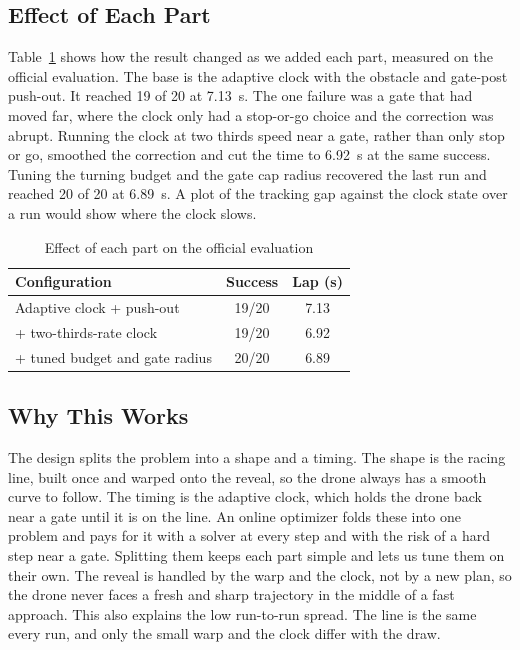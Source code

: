 \documentclass[conference]{IEEEtran}
\begin{document}
\subsection{Effect of Each Part}
Table~\ref{tab:ablation} shows how the result changed as we added each part, measured on the official evaluation. The base is the adaptive clock with the obstacle and gate-post push-out. It reached 19 of 20 at 7.13~s. The one failure was a gate that had moved far, where the clock only had a stop-or-go choice and the correction was abrupt. Running the clock at two thirds speed near a gate, rather than only stop or go, smoothed the correction and cut the time to 6.92~s at the same success. Tuning the turning budget and the gate cap radius recovered the last run and reached 20 of 20 at 6.89~s. A plot of the tracking gap against the clock state over a run would show where the clock slows.

\begin{table}[htbp]
\caption{Effect of each part on the official evaluation}
\begin{center}
\begin{tabular}{|l|c|c|}
\hline
\textbf{Configuration} & \textbf{Success} & \textbf{Lap (s)} \\
\hline
Adaptive clock + push-out & 19/20 & 7.13 \\
\hline
+ two-thirds-rate clock & 19/20 & 6.92 \\
\hline
+ tuned budget and gate radius & 20/20 & 6.89 \\
\hline
\end{tabular}
\label{tab:ablation}
\end{center}
\end{table}

\subsection{Why This Works}
The design splits the problem into a shape and a timing. The shape is the racing line, built once and warped onto the reveal, so the drone always has a smooth curve to follow. The timing is the adaptive clock, which holds the drone back near a gate until it is on the line. An online optimizer folds these into one problem and pays for it with a solver at every step and with the risk of a hard step near a gate. Splitting them keeps each part simple and lets us tune them on their own. The reveal is handled by the warp and the clock, not by a new plan, so the drone never faces a fresh and sharp trajectory in the middle of a fast approach. This also explains the low run-to-run spread. The line is the same every run, and only the small warp and the clock differ with the draw.
\end{document}

